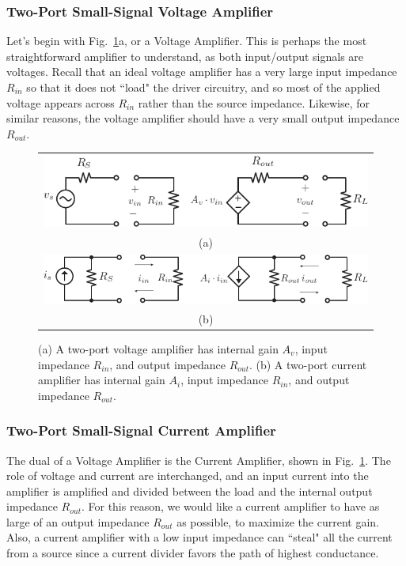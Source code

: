 \subsubsection{Two-Port Small-Signal Voltage Amplifier}
Let's begin with Fig.~\ref{fig:vi_amp}a, or a Voltage Amplifier.  This is perhaps the most straightforward amplifier to understand, as both input/output signals are voltages.  Recall that an ideal voltage amplifier has a very large input impedance $R_{in}$ so that it does not ``load" the driver circuitry, and so most of the applied voltage appears across $R_{in}$ rather than the source impedance.  Likewise, for similar reasons, the voltage amplifier should have a very small output impedance $R_{out}$.
\begin{figure}[tb]
\centering
\begin{tabular}{c}
\includegraphics[width=.7\columnwidth]{vamp_label}\\
(a)\\
\includegraphics[width=.7\columnwidth]{iamp}\\
(b)\\
\end{tabular}
\caption{(a) A two-port voltage amplifier has internal gain $A_v$, input impedance $R_{in}$, and output impedance $R_{out}$.  (b) A two-port current amplifier has internal gain $A_i$, input impedance $R_{in}$, and output impedance $R_{out}$.}
\label{fig:vi_amp}
\end{figure}
\subsubsection{Two-Port Small-Signal Current Amplifier}
The dual of a Voltage Amplifier is the Current Amplifier, shown in Fig.~\ref{fig:vi_amp}.  The role of voltage and current are interchanged, and an input current into the amplifier is amplified and divided between the load and the internal output impedance $R_{out}$.  For this reason, we would like a current amplifier to have as large of an output impedance $R_{out}$ as possible, to maximize the current gain.  Also, a current amplifier with a low input impedance can ``steal" all the current from a source since a current divider favors the path of highest conductance.

